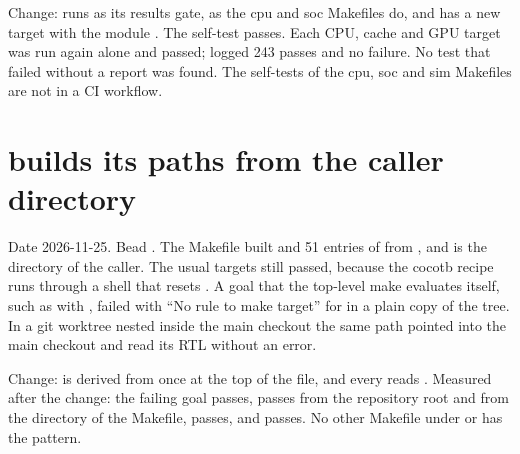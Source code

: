 \begin{record}

Change:  runs  as its results gate, as the cpu and soc Makefiles do, and has a new target  with the module . The self-test passes. Each CPU, cache and GPU target was run again alone and passed;  logged 243 passes and no failure. No test that failed without a report was found. The self-tests of the cpu, soc and sim Makefiles are not in a CI workflow.

\end{record}

\section{ builds its paths from the caller directory}\label{cr:defect:cpu-makefile-pwd}

\begin{record}

Date 2026-11-25. Bead . The Makefile built  and 51 entries of  from , and  is the directory of the caller. The usual targets still passed, because the cocotb  recipe runs  through a shell that resets . A goal that the top-level make evaluates itself, such as  with , failed with ``No rule to make target'' for  in a plain copy of the tree. In a git worktree nested inside the main checkout the same path pointed into the main checkout and read its RTL without an error.

\end{record}

\begin{record}

Change:  is derived from  once at the top of the file, and every  reads . Measured after the change: the failing goal passes,  passes from the repository root and from the directory of the Makefile,  passes, and  passes. No other Makefile under  or  has the pattern.

\end{record}

